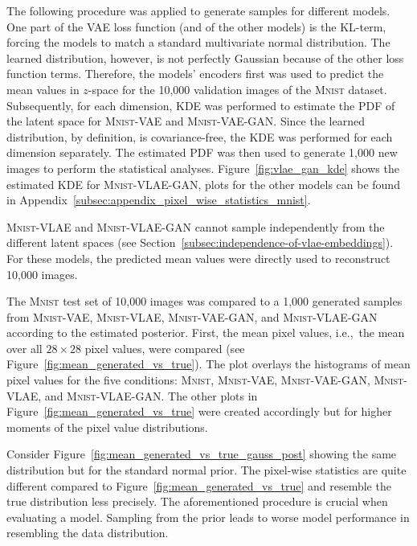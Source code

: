 The following procedure was applied to generate samples for different models.
One part of the \ac{VAE} loss function (and of the other models) is the \ac{KL}-term, forcing the models to match a standard multivariate normal distribution.
The learned distribution, however, is not perfectly Gaussian because of the other loss function terms.
Therefore, the models' encoders first was used to predict the mean values in $z$-space for the 10,000 validation images of the \textsc{Mnist} dataset.
Subsequently, for each dimension, \ac{KDE} was performed to estimate the \ac{PDF} of the latent space for \textsc{Mnist}-\ac{VAE} and \textsc{Mnist}-\ac{VAE}-\ac{GAN}.
Since the learned distribution, by definition, is covariance-free, the \ac{KDE} was performed for each dimension separately.
The estimated \ac{PDF} was then used to generate 1,000 new images to perform the statistical analyses.
Figure~\ref{fig:vlae_gan_kde} shows the estimated \ac{KDE} for \textsc{Mnist}-\ac{VLAE}-\ac{GAN}, plots for the other models can be found in Appendix~\ref{subsec:appendix_pixel_wise_statistics_mnist}.

\textsc{Mnist}-\ac{VLAE} and \textsc{Mnist}-\ac{VLAE}-\ac{GAN} cannot sample independently from the different latent spaces (see Section~\ref{subsec:independence-of-vlae-embeddings}).
For these models, the predicted mean values were directly used to reconstruct 10,000 images.

The \textsc{Mnist} test set of 10,000 images was compared to a 1,000 generated samples from \textsc{Mnist}-\ac{VAE}, \textsc{Mnist}-\ac{VLAE}, \textsc{Mnist}-\ac{VAE}-\ac{GAN}, and \textsc{Mnist}-\ac{VLAE}-\ac{GAN} according to the estimated posterior.
First, the mean pixel values, i.e.,~the mean over all $28\times 28$ pixel values, were compared (see Figure~\ref{fig:mean_generated_vs_true}).
The plot overlays the histograms of mean pixel values for the five conditions: \textsc{Mnist}, \textsc{Mnist}-\ac{VAE}, \textsc{Mnist}-\ac{VAE}-\ac{GAN}, \textsc{Mnist}-\ac{VLAE}, and \textsc{Mnist}-\ac{VLAE}-\ac{GAN}.
The other plots in Figure~\ref{fig:mean_generated_vs_true} were created accordingly but for higher moments of the pixel value distributions.

Consider Figure~\ref{fig:mean_generated_vs_true_gauss_post} showing the same distribution but for the standard normal prior.
The pixel-wise statistics are quite different compared to Figure~\ref{fig:mean_generated_vs_true} and resemble the true distribution less precisely.
The aforementioned procedure is crucial when evaluating a model.
Sampling from the prior leads to worse model performance in resembling the data distribution.

